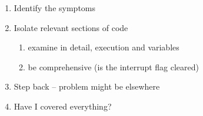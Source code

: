 \documentclass{beamer}
\begin{document}
\begin{frame}
  \begin{enumerate}
  \item Identify the symptoms
  \item Isolate relevant sections of code
    \begin{enumerate}
    \item examine in detail, execution and variables
    \item be comprehensive (is the interrupt flag cleared)
    \end{enumerate}
  \item Step back -- problem might be elsewhere
  \item Have I covered everything?
  \end{enumerate}
\end{frame}
\end{document}
